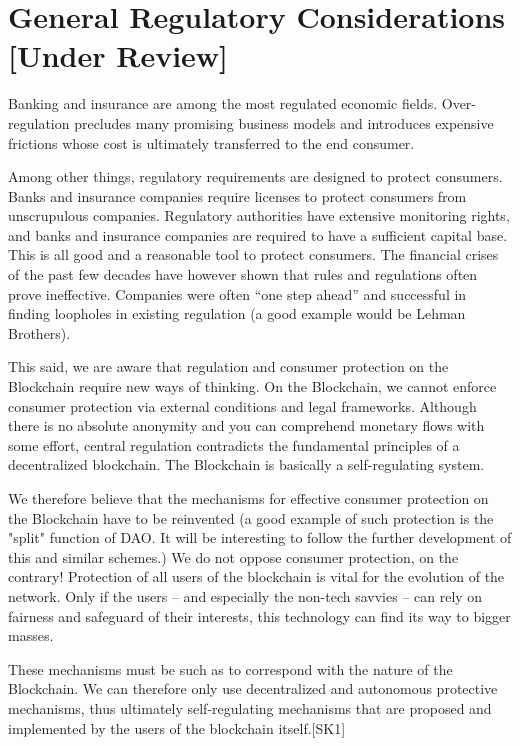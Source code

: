 \documentclass[12pt]{article}
\begin{document}
\section{General Regulatory Considerations [Under Review]}

Banking and insurance are among the  most regulated economic fields. Over-regulation  precludes many promising business models and introduces expensive frictions whose cost is ultimately transferred  to the end consumer.


Among other things, regulatory requirements are designed to protect consumers. Banks and insurance companies require licenses to protect consumers from unscrupulous companies. Regulatory authorities have extensive monitoring rights, and banks and insurance companies are required to have a sufficient capital base. This is all good and a reasonable tool to protect consumers. The financial crises of the past few decades have however shown that rules and regulations often prove ineffective. Companies were often “one step ahead” and successful in finding loopholes in existing regulation (a good example would be Lehman Brothers).

This said, we are aware that regulation and consumer protection on the Blockchain require new ways of thinking. On the Blockchain, we cannot enforce consumer protection via external conditions and legal frameworks. Although there is no absolute anonymity and you can comprehend monetary flows with some effort, central regulation contradicts the fundamental principles of a decentralized blockchain. The Blockchain is basically a self-regulating system.

We therefore believe that the mechanisms for effective consumer protection on the Blockchain have to be reinvented (a good example of such protection is the "split" function of DAO. It will be interesting to follow the further development of this and similar schemes.)
We do not oppose consumer protection, on the contrary! Protection of all users of the blockchain  is vital for the evolution of the network. Only if the users – and  especially the non-tech savvies – can rely on fairness and safeguard of their interests, this technology can find its way to bigger masses.

These mechanisms must be such as to  correspond with the nature of the Blockchain. We can therefore only use decentralized and autonomous protective mechanisms, thus ultimately self-regulating mechanisms that are proposed and implemented by the users of the blockchain itself.[SK1] 
\end{document}
